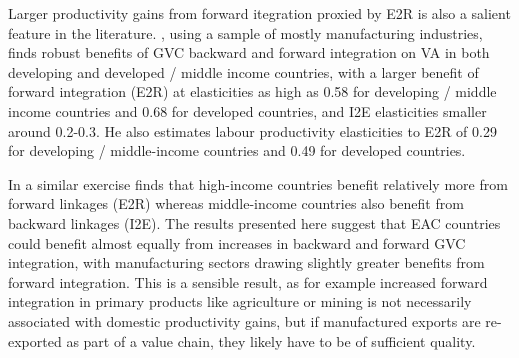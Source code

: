 \documentclass[a4paper]{article}
\begin{document}
Larger productivity gains from forward itegration proxied by E2R is also a salient feature in the literature. \citet{Kummritz20161}, using a sample of mostly manufacturing industries, finds robust benefits of GVC backward and forward integration on VA in both developing and developed / middle income countries, with a larger benefit of forward integration (E2R) at elasticities as high as 0.58 for developing / middle income countries and 0.68 for developed countries, and I2E elasticities smaller around 0.2-0.3. He also estimates labour productivity elasticities to E2R of 0.29 for developing / middle-income countries and 0.49 for developed countries. \newline 

In a similar exercise \citet{kummritz2015global} finds that high-income countries benefit relatively more from forward linkages (E2R) whereas middle-income countries also benefit from backward linkages (I2E). The results presented here suggest that EAC countries could benefit almost equally from increases in backward and forward GVC integration, with manufacturing sectors drawing slightly greater benefits from forward integration. 
This is a sensible result, as for example increased forward integration in primary products like agriculture or mining is not necessarily associated with domestic productivity gains, but if manufactured exports are re-exported as part of a value chain, they likely have to be of sufficient quality.  \newline 
\end{document}
